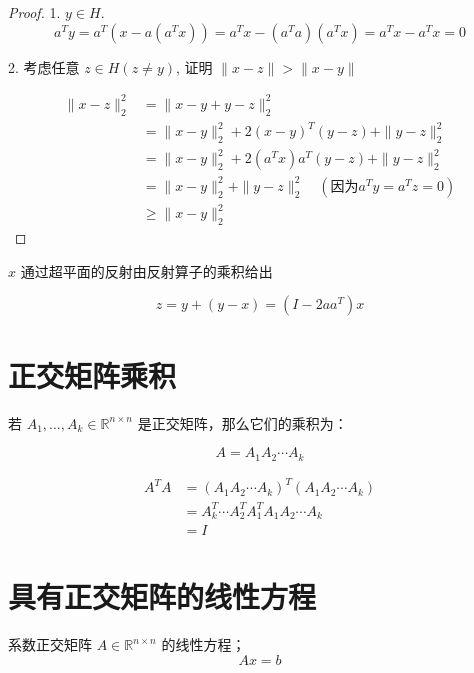 \begin{proof}
1. $ y \in H $.
$$
a^{T} y=a^{T}\left(x-a\left(a^{T} x\right)\right)=a^{T} x-\left(a^{T} a\right)\left(a^{T} x\right)=a^{T} x-a^{T} x=0
$$

2. 考虑任意 $ z \in H(z \neq y) $, 证明 $ \|x-z\|>\|x-y\| $

$$ \begin{aligned}\|x-z\|_{2}^{2} &=\|x-y+y-z\|_{2}^{2} 
    \\ &=\|x-y\|_{2}^{2}+2(x-y)^{T}(y-z)+\|y-z\|_{2}^{2} 
    \\ &=\|x-y\|_{2}^{2}+2\left(a^{T} x\right) a^{T}(y-z)+\|y-z\|_{2}^{2}
    \\ &=\|x-y\|_{2}^{2}+\|y-z\|_{2}^{2} \quad (因为  a^{T} y=a^{T} z = 0)
    \\ &\ge \|x-y\|_{2}^{2}
\end{aligned} $$

\end{proof}

\begin{corollary}
    $ x $ 通过超平面的反射由反射算子的乘积给出

    $$ z=y+(y-x)=\left(I-2 a a^{T}\right) x $$
\end{corollary}

\section{正交矩阵乘积}

若 $ A_{1}, \ldots, A_{k} \in \mathbb{R}^{n \times n} $ 是正交矩阵，那么它们的乘积为：

$$ A=A_{1} A_{2} \cdots A_{k} $$

\begin{corollary}[正交矩阵乘积的正交性]

$$\begin{aligned}
    A^{T} A&=\left(A_{1} A_{2} \cdots A_{k}\right)^{T}\left(A_{1} A_{2} \cdots A_{k}\right)\\
    &=A_{k}^{T} \cdots A_{2}^{T} A_{1}^{T} A_{1} A_{2} \cdots A_{k}\\
    &=I
\end{aligned}$$

\end{corollary}


\section{具有正交矩阵的线性方程}

系数正交矩阵 $ A \in \mathbb{R}^{n \times n} $ 的线性方程；
$$
A x=b
$$

